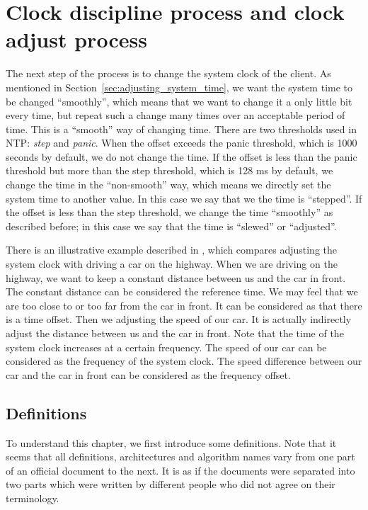 

\chapter{Clock discipline process and clock adjust process}%
\label{cha:clock_discipline_process}
The next step of the process is to change the system clock of the client. As
mentioned in Section~\ref{sec:adjusting_system_time}, we want the system time
to be changed ``smoothly'', which means that we want to change it a only little
bit every time, but repeat such a change many times over an acceptable period
of time. This is a ``smooth'' way of changing time. There are two thresholds
used in NTP: \emph{step} and \emph{panic}. When the offset exceeds the panic
threshold, which is 1000 seconds by default, we do not change the time. If the
offset is less than the panic threshold but more than the step threshold, which
is 128 ms by default, we change the time in the ``non-smooth'' way, which means
we directly set the system time to another value. In this case we say that
we the time is ``stepped''. If the offset is less than the step threshold, we
change the time ``smoothly'' as described before; in this case we say that the
time is ``slewed'' or ``adjusted''.

There is an illustrative example described in \cite{redbook}, which compares
adjusting the system clock with driving a car on the highway. When we are driving
on the highway, we want to keep a constant distance between us and the car in
front.  The constant distance can be considered the reference time. We may feel
that we are too close to or too far from the car in front. It can be considered
as that there is a time offset. Then we adjusting the speed of our car.  It is
actually indirectly adjust the distance between us and the car in front.  Note
that the time of the system clock increases at a certain frequency. The speed
of our car can be considered as the frequency of the system clock. The speed
difference between our car and the car in front can be considered as the
frequency offset.

\section{Definitions}%
\label{sec:clock_discipline_concepts}
To understand this chapter, we first introduce some definitions.  Note that it
seems that all definitions, architectures and algorithm names vary from one
part of an official document to the next.  It is as if the documents were
separated into two parts which were written by different people who did not
agree on their terminology.

